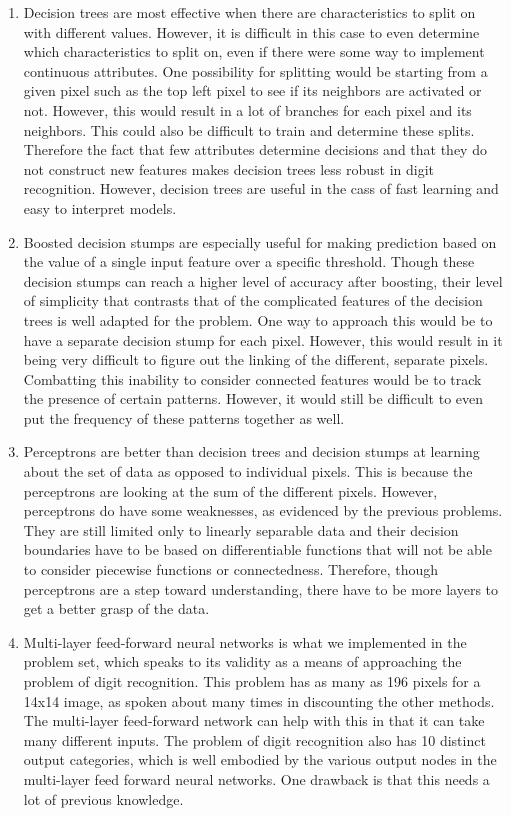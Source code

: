 \documentclass[11pt]{article}
\begin{document}
\begin{enumerate}
\begin{enumerate}
	\item Decision trees are most effective when there are characteristics to split on with different values. However, it is difficult in this case to even determine which characteristics to split on, even if there were some way to implement continuous attributes. One possibility for splitting would be starting from a given pixel such as the top left pixel to see if its neighbors are activated or not. However, this would result in a lot of branches for each pixel and its neighbors. This could also be difficult to train and determine these splits. Therefore the fact that few attributes determine decisions and that they do not construct new features makes decision trees less robust in digit recognition. However, decision trees are useful in the cass of fast learning and easy to interpret models.
	\item Boosted decision stumps are especially useful for making prediction based on the value of a single input feature over a specific threshold. Though these decision stumps can reach a higher level of accuracy after boosting, their level of simplicity that contrasts that of the complicated features of the decision trees is well adapted for the problem. One way to approach this would be to have a separate decision stump for each pixel. However, this would result in it being very difficult to figure out the linking of the different, separate pixels. Combatting this inability to consider connected features would be to track the presence of certain patterns. However, it would still be difficult to even put the frequency of these patterns together as well.
	\item Perceptrons are better than decision trees and decision stumps at learning about the set of data as opposed to individual pixels. This is because the perceptrons are looking at the sum of the different pixels. However, perceptrons do have some weaknesses, as evidenced by the previous problems. They are still limited only to linearly separable data and their decision boundaries have to be based on differentiable functions that will not be able to consider piecewise functions or connectedness. Therefore, though perceptrons are a step toward understanding, there have to be more layers to get a better grasp of the data. 
	\item Multi-layer feed-forward neural networks is what we implemented in the problem set, which speaks to its validity as a means of approaching the problem of digit recognition. This problem has as many as 196 pixels for a 14x14 image, as spoken about many times in discounting the other methods. The multi-layer feed-forward network can help with this in that it can take many different inputs. The problem of digit recognition also has 10 distinct output categories, which is well embodied by the various output nodes in the multi-layer feed forward neural networks. One drawback is that this needs a lot of previous knowledge. 

\end{enumerate}
\end{enumerate}
\end{document}
